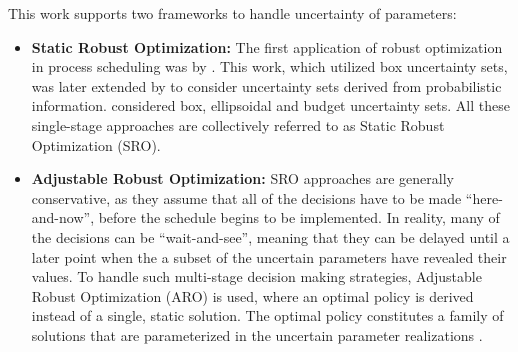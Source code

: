 This work supports two frameworks to handle uncertainty of parameters:

\begin{itemize}
\item \textbf{Static Robust Optimization: } The first application of robust optimization in process scheduling was by \cite{LIN20041069}. This work, which utilized box uncertainty sets, was later extended by \cite{JANAK2007171} to consider uncertainty sets derived from probabilistic information. \cite{LiIerapetritou} considered box, ellipsoidal and budget uncertainty sets. All these single-stage approaches are collectively referred to as Static Robust Optimization (SRO).

\item \textbf{Adjustable Robust Optimization: } SRO approaches are generally conservative, as they assume that all of the decisions have to be made 	``here-and-now'', before the schedule begins to be implemented. In reality, many of the decisions can be ``wait-and-see'', meaning that they can be delayed until a later point when the a subset of the uncertain parameters have revealed their values. To handle such multi-stage decision making strategies, Adjustable Robust Optimization (ARO) is used, where an optimal policy is derived instead of a single, static solution. The optimal policy constitutes a family of solutions that are parameterized in the uncertain parameter realizations \citep{lappas}.

\end{itemize}
